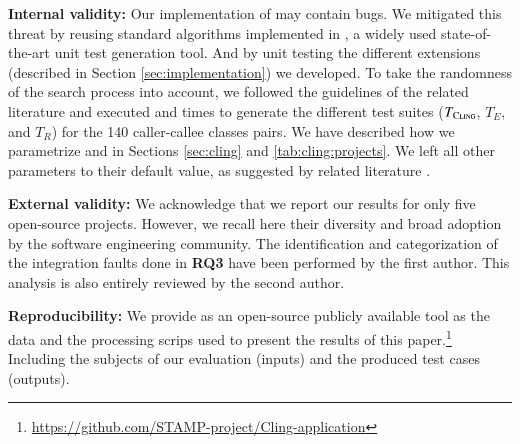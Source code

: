 
\textbf{Internal validity:}
Our implementation of \cling may contain bugs. We mitigated this threat by reusing standard algorithms implemented in \evosuite, a widely used state-of-the-art unit test generation tool. And by unit testing the different extensions (described in Section \ref{sec:implementation}) we developed. 
%
To take the randomness of the search process into account, we followed the guidelines of the related literature \cite{Arcuri2014} and executed \cling and  times to generate the different test suites ($T_{\textsc{Cling}}$, $T_{E}$, and $T_{R}$) for the 140 caller-callee classes pairs. 
%
We have described how we parametrize \cling and \evosuite in Sections \ref{sec:cling} and \ref{tab:cling:projects}. We left all other parameters to their default value, as suggested by related literature \cite{Arcuri2013, Panichella2015, Shamshiri2018}.

\textbf{External validity:}
We acknowledge that we report our results for only five open-source projects. However, we recall here their diversity and broad adoption by the software engineering community.
%
The identification and categorization of the integration faults done in \textbf{RQ3} have been performed by the first author. This analysis is also entirely reviewed by the second author.

\textbf{Reproducibility:}
We provide \cling as an open-source publicly available tool  as the data and the processing scrips used to present the results of this paper.\footnote{\url{https://github.com/STAMP-project/Cling-application}} Including the subjects of our evaluation (inputs) and the produced test cases (outputs). 


